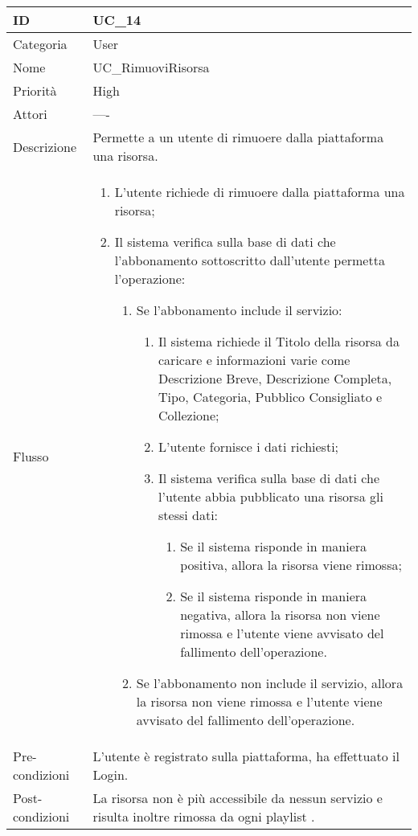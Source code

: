 \begin{center}
\begin{tabular}{ |p{2cm}|p{13cm}|  }
\hline
ID & UC\_14 \\\hline
Categoria & User\\\hline
Nome & UC\_RimuoviRisorsa\\\hline
Priorità & High \\\hline
Attori &  ---- \\\hline
Descrizione & Permette a un utente di rimuoere dalla piattaforma una risorsa.\\\hline
Flusso &  	\begin{enumerate}
			\item L'utente richiede di rimuoere dalla piattaforma una risorsa;
			\item Il sistema verifica sulla base di dati che l'abbonamento sottoscritto dall'utente permetta l'operazione:
			\begin{enumerate}
				\item Se l'abbonamento include il servizio:
				\begin{enumerate}
					\item Il sistema richiede il Titolo della risorsa da caricare e informazioni varie come Descrizione Breve,  Descrizione Completa, Tipo, Categoria, Pubblico Consigliato e Collezione;
					\item L'utente fornisce i dati richiesti;
					\item Il sistema verifica sulla base di dati che l'utente abbia pubblicato una risorsa gli stessi dati:
					\begin{enumerate}
						\item Se il sistema risponde in maniera positiva, allora la risorsa viene rimossa;
						\item Se il sistema risponde in maniera negativa, allora  la risorsa non viene rimossa e l'utente viene avvisato del fallimento dell'operazione.
					\end{enumerate}
				\end{enumerate}
				\item Se l'abbonamento non include il servizio, allora la risorsa non viene rimossa e l'utente viene avvisato del fallimento dell'operazione.
			\end{enumerate}
		\end{enumerate}\\\hline
Pre-condizioni & L'utente è registrato sulla piattaforma, ha effettuato il Login.\\\hline
Post-condizioni & La risorsa non è più accessibile da nessun servizio e risulta inoltre rimossa da ogni playlist .\\\hline
\end{tabular}
\label{table_use_case:14}\newline


\end{center}
